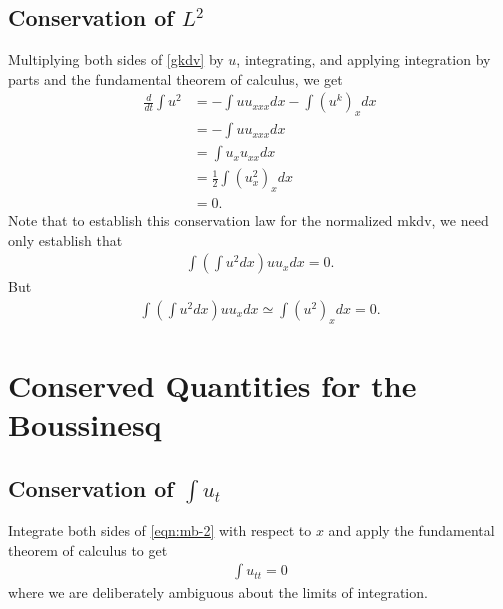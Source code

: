 \documentclass[12pt,reqno]{amsart}
\numberwithin{equation}{section}  %
\begin{document}
\subsection{Conservation of $L^{2}$}
\label{ssec:c-l2}
Multiplying both sides of \eqref{gkdv} by $u$, integrating, and applying
integration by parts and the
fundamental theorem of calculus, we get
%
%
\begin{equation*}
\begin{split}
  \frac{d}{dt} \int u^{2} 
  & = - \int u u_{xxx} dx - \int (u^{k})_{x} dx
  \\
  & = - \int u u_{xxx} dx
  \\
  & =  \int u_{x} u_{xx}dx
  \\
  & = \frac{1}{2} \int (u_{x}^{2})_{x} dx
  \\
  & = 0.
\end{split}
\end{equation*}
%
%
Note that to establish this conservation law for the normalized mkdv, we need
only establish that
%
%
\begin{equation*}
\begin{split}
  \int \left ( \int u^{2} dx \right ) u u_{x} dx = 0.
\end{split}
\end{equation*}
%
%
But 
\begin{equation*}
\begin{split}
  \int \left ( \int u^{2} dx \right ) u u_{x} dx \simeq \int  (u^{2})_{x} dx =
  0.
\end{split}
\end{equation*}
%
%
\section{Conserved Quantities for the Boussinesq}
\subsection{Conservation of $\int u_{t}$} 
\label{ssec:c-mass-bous}
Integrate both sides of \eqref{eqn:mb-2} with respect to $x$
and apply the fundamental theorem of
calculus to get
%
%
\begin{equation*}
\begin{split}
  \int u_{tt} = 0
\end{split}
\end{equation*}
%
%
where we are deliberately ambiguous about the limits of integration. 
%
%
\end{document}
